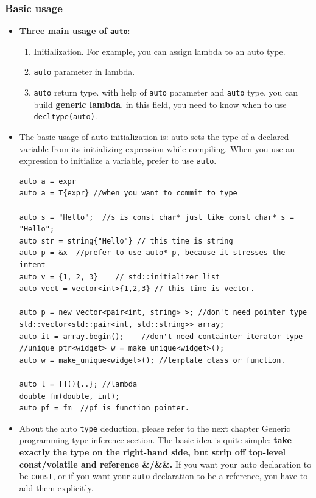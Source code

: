 \documentclass[a4paper,11pt,twoside]{book}
\begin{document}
\subsubsection{Basic usage}
\begin{itemize}
	\item \textbf{Three main usage of \texttt{auto}}:
	\begin{enumerate}
		\item Initialization. For example, you can assign lambda to an auto type.
		\item \texttt{auto} parameter in lambda.
		\item \texttt{auto} return type.  with help of \texttt{auto} parameter and \texttt{auto} type, you can build \textbf{generic lambda}. in this field, you need to know when to use \texttt{decltype(auto)}.
	\end{enumerate}

	\item The basic usage of auto initialization is: auto sets the type of a declared variable from its initializing expression while compiling. When you use an expression to initialize a variable, prefer to use \texttt{auto}.
\begin{lstlisting}[numbers=none]
auto a = expr
auto a = T{expr} //when you want to commit to type

auto s = "Hello";  //s is const char* just like const char* s = "Hello";
auto str = string{"Hello"} // this time is string
auto p = &x  //prefer to use auto* p, because it stresses the intent
auto v = {1, 2, 3}    // std::initializer_list
auto vect = vector<int>{1,2,3} // this time is vector.

auto p = new vector<pair<int, string> >; //don't need pointer type
std::vector<std::pair<int, std::string>> array;
auto it = array.begin();    //don't need containter iterator type
//unique_ptr<widget> w = make_unique<widget>();
auto w = make_unique<widget>(); //template class or function.

auto l = [](){..}; //lambda
double fm(double, int);
auto pf = fm  //pf is function pointer.        
\end{lstlisting}
	
	\item About the auto \texttt{type} deduction, please refer to the next chapter Generic programming type inference section. The basic idea is quite simple: \textbf{take exactly the type on the right-hand side, but strip off top-level const/volatile and reference \&/\&\&.} If you want your auto declaration to be \texttt{const}, or if you want your \texttt{auto} declaration to be a reference, you have to add them explicitly.
	

\end{itemize}
\end{document}
